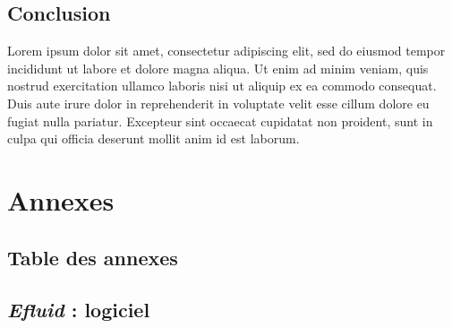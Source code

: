 \documentclass[a4paper, 12pt]{report}
\begin{document}
\chapter*{Conclusion}

Lorem ipsum dolor sit amet, consectetur adipiscing elit, sed do eiusmod tempor incididunt ut labore et dolore magna aliqua. Ut enim ad minim veniam, quis nostrud exercitation ullamco laboris nisi ut aliquip ex ea commodo consequat. Duis aute irure dolor in reprehenderit in voluptate velit esse cillum dolore eu fugiat nulla pariatur. Excepteur sint occaecat cupidatat non proident, sunt in culpa qui officia deserunt mollit anim id est laborum.

\part{Annexes}
\renewcommand{\clearpage}{}
\chapter*{Table des annexes}
\renewcommand\ptctitle{}
\parttoc
\thispagestyle{empty}
\renewcommand{\clearpage}{\newpage}
\appendix

\chapter{\textit{Efluid} : logiciel}
\label{appendix:logiciel}
\end{document}
